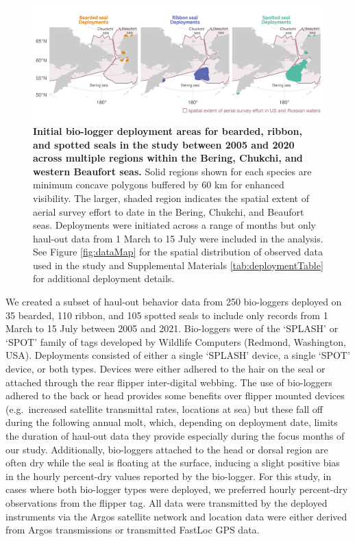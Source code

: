 \documentclass[fleqn,10pt,lineno]{wlpeerj} %
\begin{document}
\begin{figure}
\includegraphics[width=1\linewidth]{../figures/deployplot-1} \caption{\textbf{Initial bio-logger deployment areas for bearded, ribbon, and spotted seals in the study between 2005 and 2020 across multiple regions within the Bering, Chukchi, and western Beaufort seas.} \linebreak Solid regions shown for each species are minimum concave polygons buffered by 60 km for enhanced visibility. The larger, shaded region indicates the spatial extent of aerial survey effort to date in the Bering, Chukchi, and Beaufort seas. Deployments were initiated across a range of months but only haul-out data from 1 March to 15 July were included in the analysis. See Figure \ref{fig:dataMap} for the spatial distribution of observed data used in the study and Supplemental Materials \ref{tab:deploymentTable} for additional deployment details.}\label{fig:deployplot}
\end{figure}

We created a subset of haul-out behavior data from
250 bio-loggers deployed on
35 bearded,
110 ribbon, and
105 spotted seals
to include only records from 1 March to 15 July between
2005 and
2021. Bio-loggers were of the
`SPLASH' or `SPOT' family of tags developed by Wildlife Computers (Redmond,
Washington, USA). Deployments consisted of either a single `SPLASH' device, a
single `SPOT' device, or both types. Devices were either adhered to the hair on
the seal or attached through the rear flipper inter-digital webbing. The use of
bio-loggers adhered to the back or head provides some benefits over flipper
mounted devices (e.g.~increased satellite transmittal rates, locations at sea)
but these fall off during the following annual molt, which, depending on
deployment date, limits the duration of haul-out data they provide especially
during the focus months of our study. Additionally, bio-loggers attached to the
head or dorsal region are often dry while the seal is floating at the surface,
inducing a slight positive bias in the hourly percent-dry values reported by the
bio-logger. For this study, in cases where both bio-logger types were deployed,
we preferred hourly percent-dry observations from the flipper tag. All data were
transmitted by the deployed instruments via the Argos satellite network and
location data were either derived from Argos transmissions or transmitted
FastLoc GPS data.
\end{document}
